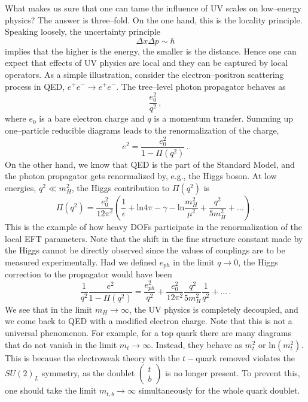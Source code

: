 \documentclass[12pt]{article}
\newcommand{\be}{\begin{equation}}
\newcommand{\ee}{\end{equation}}
\begin{document}
What makes us sure that one can tame the influence of UV scales on low--energy physics? The answer is three--fold. On the one hand, this is the locality principle. Speaking loosely, the uncertainty principle
\be
\Delta x\Delta p\sim\hbar
\ee
implies that the higher is the energy, the smaller is the distance.
Hence one can expect that effects of UV physics are local and they can be captured by local operators. As a simple illustration, consider the electron--positron scattering process in QED, $e^+e^-\rightarrow e^+e^-$. The tree--level photon propagator behaves as
\be
\dfrac{e_0^2}{q^2} \,,
\ee
where $e_0$ is a bare electron charge and $q$ is a momentum transfer.
Summing up one--particle reducible diagrams leads to the renormalization of the charge,
\be
e^2=\dfrac{e_0^2}{1-\Pi(q^2)} \,.
\ee
On the other hand, we know that QED is the part of the Standard Model, and the photon propagator gets renormalized by, e.g., the Higgs boson. At low energies, $q^2\ll m_H^2$, the Higgs contribution to $\Pi(q^2)$ is
\be
\Pi(q^2)=\dfrac{e_0^2}{12\pi^2}\left(\dfrac{1}{\epsilon}+\text{ln}4\pi -\gamma-\text{ln}\dfrac{m_H^2}{\mu^2}+\dfrac{q^2}{5m_H^2}+...\right)\,.
\ee
This is the example of how heavy DOFs participate in the renormalization of the local EFT parameters.
Note that the shift in the fine structure constant made by the Higgs cannot be directly observed since the values of couplings are to be measured experimentally.
Had we defined $e_{ph}$ in the limit $q\rightarrow 0$, the Higgs correction to the propagator would have been
\be
\dfrac{1}{q^2}\dfrac{e^2}{1-\Pi(q^2)}=\dfrac{e_{ph}^2}{q^2}+\dfrac{e_0^2}{12\pi^2}\dfrac{q^2}{5m_H^2}\dfrac{1}{q^2}+...\,.
\ee
We see that in the limit $m_H\rightarrow\infty$, the UV physics is completely decoupled, and we come back to QED with a modified electron charge. Note that this is not a universal phenomenon. For example, for a top quark there are many diagrams that do not vanish in the limit $m_t\rightarrow\infty$. Instead, they behave as $m_t^2$ or $\text{ln}(m_t^2)$. This is because the electroweak theory with the $t-$quark removed violates the $SU(2)_L$ symmetry, as the doublet $\left(\begin{matrix}
t \\
b
\end{matrix}\right)$ is no longer present.
To prevent this, one should take the limit $m_{t,b}\rightarrow\infty$ simultaneously for the whole quark doublet.
\end{document}
